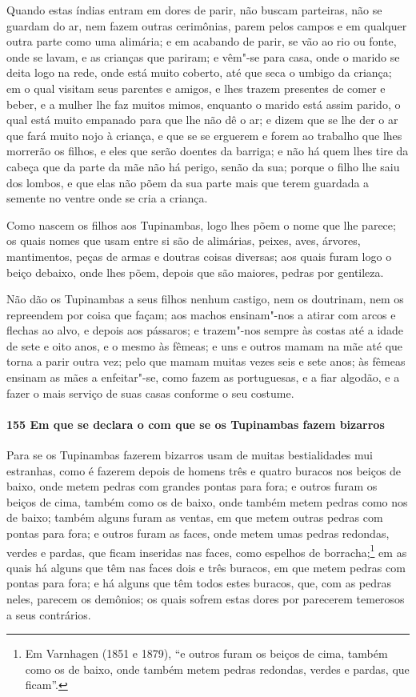 Quando estas índias entram em dores de parir, não buscam parteiras, não se guardam do ar,
nem fazem outras cerimônias, parem pelos campos e em qualquer outra parte como uma
alimária; e em acabando de parir, se vão ao rio ou fonte, onde se lavam, e as crianças que
pariram; e vêm"-se para casa, onde o marido se deita logo na rede, onde está muito coberto,
até que seca o umbigo da criança; em o qual visitam seus parentes e amigos, e lhes trazem
presentes de comer e beber, e a mulher lhe faz muitos mimos, enquanto o marido está assim
parido, o qual está muito empanado para que lhe não dê o ar; e dizem que se lhe der o ar
que fará muito nojo à criança, e que se se erguerem e forem ao trabalho que lhes morrerão
os filhos, e eles que serão doentes da barriga; e não há quem lhes tire da cabeça que da
parte da mãe não há perigo, senão da sua; porque o filho lhe saiu dos lombos, e que elas
não põem da sua parte mais que terem guardada a semente no ventre onde se cria a criança.

Como nascem os filhos aos Tupinambas, logo lhes põem o nome que lhe parece; os quais nomes
que usam entre si são de alimárias, peixes, aves, árvores, mantimentos, peças de armas e
doutras coisas diversas; aos quais furam logo o beiço debaixo, onde lhes põem, depois que
são maiores, pedras por gentileza.

Não dão os Tupinambas a seus filhos nenhum castigo, nem os doutrinam, nem os repreendem
por coisa que façam; aos machos ensinam"-nos a atirar com arcos e flechas ao alvo, e depois
aos pássaros; e trazem"-nos sempre às costas até a idade de sete e oito anos, e o mesmo às
fêmeas; e uns e outros mamam na mãe até que torna a parir outra vez; pelo que mamam muitas
vezes seis e sete anos; às fêmeas ensinam as mães a enfeitar"-se, como fazem as
portuguesas, e a fiar algodão, e a fazer o mais serviço de suas casas conforme o seu costume.


\paragraph{155 Em que se declara o com que se os Tupinambas fazem bizarros}

Para se os Tupinambas fazerem bizarros usam de muitas bestialidades mui estranhas, como é
fazerem depois de homens três e quatro buracos nos beiços de baixo, onde metem pedras com
grandes pontas para fora; e outros furam os beiços de cima, também como os de baixo, onde
também metem pedras como nos de baixo; também alguns furam as ventas, em que metem outras
pedras com pontas para fora; e outros furam as faces, onde metem umas pedras redondas,
verdes e pardas, que ficam inseridas nas faces, como espelhos de borracha;\footnote{ Em
Varnhagen (1851 e 1879), ``e outros furam os beiços de cima, também como os de baixo, onde
também metem pedras redondas, verdes e pardas, que ficam''.} em as quais há alguns que têm
nas faces dois e três buracos, em que metem pedras com pontas para fora; e há alguns que
têm todos estes buracos, que, com as pedras neles, parecem os demônios; os quais sofrem
estas dores por parecerem temerosos a seus contrários.

